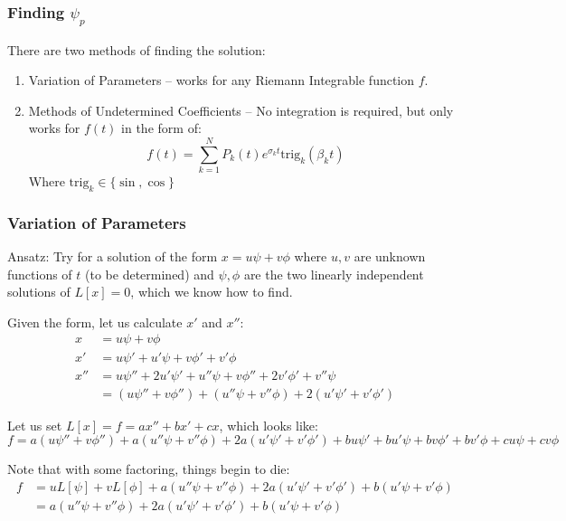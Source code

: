 \documentclass[12pt]{article}
\begin{document}
\subsubsection{Finding $\psi_p$}

There are two methods of finding the solution:
\begin{enumerate}
    \item Variation of Parameters -- works for any Riemann Integrable function
        $f$.
    \item Methods of Undetermined Coefficients -- No integration is
        required, but only works for $f(t)$ in the form of:
        \[
            f(t) = \sum_{k=1}^N P_k (t) e^{\sigma_k t}
            \text{trig}_k(\beta_k t)
        \]
        Where $\text{trig}_k \in \{\sin, \cos\}$
\end{enumerate}

\subsubsection{Variation of Parameters}

Ansatz: Try for a solution of the form $x = u\psi + v\phi$ where $u, v$ are
unknown functions of $t$ (to be determined) and $\psi, \phi$ are the two
linearly independent solutions of $L[x] = 0$, which we know how to find.

Given the form, let us calculate $x'$ and $x''$:
\[
\begin{aligned}
    x &= u\psi + v\phi\\
    x' &= u\psi' + u'\psi + v\phi' + v'\phi\\
    x'' &= u\psi'' + 2u'\psi' + u''\psi + v\phi'' + 2v'\phi' + v''\psi\\
        &= (u\psi'' + v\phi'') + (u''\psi + v''\phi) + 2(u'\psi' + v'\phi')
\end{aligned}
\]

Let us set $L[x] = f = ax'' + bx' + cx$, which looks like:
\[
    f = a(u\psi'' + v\phi'') + a(u''\psi + v''\phi) + 2a(u'\psi' + v'\phi') +
    bu\psi' + bu'\psi + bv\phi' + bv'\phi + cu\psi + cv\phi
\]

Note that with some factoring, things begin to die:
\[
\begin{aligned}
    f &= uL[\psi] + vL[\phi] + a(u''\psi + v''\phi) + 2a(u'\psi' + v'\phi') +
    b(u'\psi + v'\phi)\\
      &= a(u''\psi + v''\phi) + 2a(u'\psi' + v'\phi') +
    b(u'\psi + v'\phi)
\end{aligned}
\]
\end{document}
